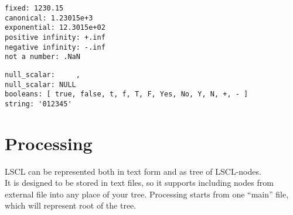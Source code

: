 \begin{lstlisting}[caption = floating point]
fixed: 1230.15
canonical: 1.23015e+3
exponential: 12.3015e+02
positive infinity: +.inf
negative infinity: -.inf
not a number: .NaN
\end{lstlisting}

\begin{lstlisting}[caption = miscellaneous]
null_scalar:     ,
null_scalar: NULL
booleans: [ true, false, t, f, T, F, Yes, No, Y, N, +, - ]
string: '012345'
\end{lstlisting}





\section{Processing}
LSCL can be represented both in text form and as tree of LSCL-nodes.  \\
It is designed to be stored in text files, so it supports including nodes from external file into any place of your tree. Processing starts from one ``main'' file, which will represent root of the tree. 

